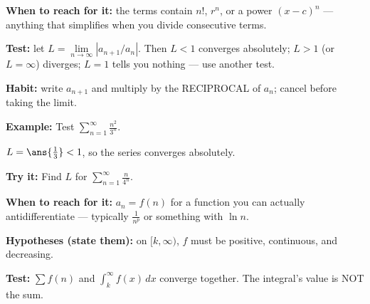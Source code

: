 \documentclass[12pt]{article}
\begin{document}


\begin{formulabox}
\textbf{When to reach for it:} the terms contain $n!$, $r^{n}$, or a power $(x-c)^{n}$ --- anything that simplifies when you divide consecutive terms.\par
\textbf{Test:} let $L=\lim\limits_{n\to\infty}\left|a_{n+1}/a_{n}\right|$. Then $L<1$ converges absolutely; $L>1$ (or $L=\infty$) diverges; $L=1$ tells you nothing --- use another test.\par
\textbf{Habit:} write $a_{n+1}$ and multiply by the RECIPROCAL of $a_{n}$; cancel before taking the limit.
\end{formulabox}

\begin{examplebox}
\textbf{Example:} \quad Test $\displaystyle\sum_{n=1}^{\infty}\frac{n^{2}}{3^{n}}$.

$L = \ans{\tfrac{1}{3}} < 1$, so the series converges absolutely.
\end{examplebox}

\begin{tryitbox}
\textbf{Try it:} \quad Find $L$ for $\displaystyle\sum_{n=1}^{\infty}\frac{n}{4^{n}}$.\\[2pt]
\end{tryitbox}


\begin{formulabox}
\textbf{When to reach for it:} $a_{n}=f(n)$ for a function you can actually antidifferentiate --- typically $\tfrac{1}{n^{p}}$ or something with $\ln n$.\par
\textbf{Hypotheses (state them):} on $[k,\infty)$, $f$ must be positive, continuous, and decreasing.\par
\textbf{Test:} $\sum f(n)$ and $\int_{k}^{\infty}f(x)\,dx$ converge together. The integral's value is NOT the sum.
\end{formulabox}
\end{document}
